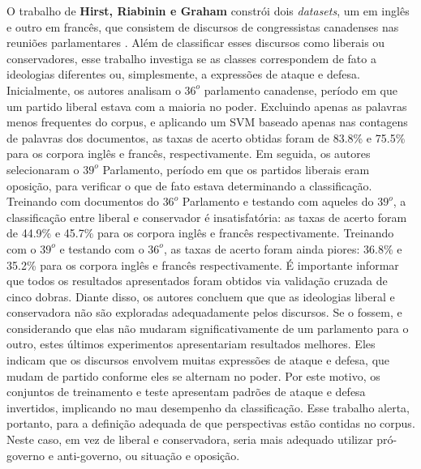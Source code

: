 O trabalho de \textbf{Hirst, Riabinin e Graham} constrói dois \emph{datasets}, um em inglês e outro em francês, que consistem de discursos de congressistas canadenses nas reuniões parlamentares \cite{hirst-et-al}. Além de classificar esses discursos como liberais ou conservadores, esse trabalho investiga se as classes correspondem de fato a ideologias diferentes ou, simplesmente, a expressões de ataque e defesa. Inicialmente, os autores analisam o \ensuremath{36^o} parlamento canadense, período em que um partido liberal estava com a maioria no poder. Excluindo apenas as palavras menos frequentes do corpus, e aplicando um SVM baseado apenas nas contagens de palavras dos documentos, as taxas de acerto obtidas foram de 83.8\% e 75.5\% para os corpora inglês e francês, respectivamente. Em seguida, os autores selecionaram o \ensuremath{39^o} Parlamento, período em que os partidos liberais eram oposição, para verificar o que de fato estava determinando a classificação. Treinando com documentos do \ensuremath{36^o} Parlamento e testando com aqueles do \ensuremath{39^o}, a classificação entre liberal e conservador é insatisfatória: as taxas de acerto foram de 44.9\% e 45.7\% para os corpora inglês e francês respectivamente. Treinando com o \ensuremath{39^o} e testando com o \ensuremath{36^o}, as taxas de acerto foram ainda piores: 36.8\% e 35.2\% para os corpora inglês e francês respectivamente. É importante informar que todos os resultados apresentados foram obtidos via validação cruzada de cinco dobras. Diante disso, os autores concluem que que as ideologias liberal e conservadora não são exploradas adequadamente pelos discursos. Se o fossem, e considerando que elas não mudaram significativamente de um parlamento para o outro, estes últimos experimentos apresentariam resultados melhores. Eles indicam que os discursos envolvem muitas expressões de ataque e defesa, que mudam de partido conforme eles se alternam no poder. Por este motivo, os conjuntos de treinamento e teste apresentam padrões de ataque e defesa invertidos, implicando no mau desempenho da classificação. Esse trabalho alerta, portanto, para a definição adequada de que perspectivas estão contidas no corpus. Neste caso, em vez de liberal e conservadora, seria mais adequado utilizar pró-governo e anti-governo, ou situação e oposição. %

